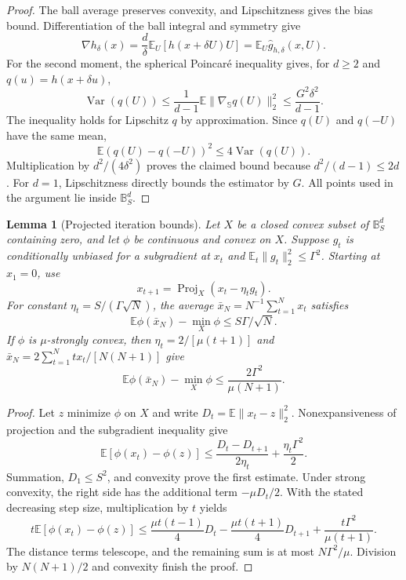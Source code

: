 \documentclass[11pt]{article}
\newcommand{\E}{\mathbb{E}}
\newcommand{\B}{\mathbb{B}}
\newcommand{\Sph}{\mathbb{S}}
\newcommand{\norm}[1]{\lVert #1\rVert_2}
\theoremstyle{plain}
\newtheorem{lemma}[lemma]{Lemma}
\theoremstyle{definition}
\begin{document}
\begin{proof}
The ball average preserves convexity, and Lipschitzness gives the
bias bound. Differentiation of the ball integral and symmetry give
\[
 \nabla h_\delta(x)=\frac d\delta\E_U[h(x+\delta U)U]
                  =\E_U\widehat g_{h,\delta}(x,U).
\]
For the second moment, the spherical Poincar\'e inequality gives, for $d\ge2$ and
$q(u)=h(x+\delta u)$,
\[
 \operatorname{Var}(q(U))
 \le\frac{1}{d-1}\E\|\nabla_{\Sph}q(U)\|_2^2
 \le\frac{G^2\delta^2}{d-1}.
\]
The inequality holds for Lipschitz $q$ by approximation. Since
$q(U)$ and $q(-U)$ have the same mean,
\[
 \E(q(U)-q(-U))^2\le4\operatorname{Var}(q(U)).
\]
Multiplication by $d^2/(4\delta^2)$ proves the claimed bound because
$d^2/(d-1)\le2d$. For $d=1$, Lipschitzness directly bounds the
estimator by $G$. All points used in the argument lie inside $\B_S^d$.
\end{proof}

\begin{lemma}[Projected iteration bounds]\label{lem:projected}
Let $X$ be a closed convex subset of $\B_S^d$ containing zero,
and let $\phi$ be continuous and convex on $X$. Suppose $g_t$ is conditionally
unbiased for a subgradient at $x_t$ and
$\E_t\norm{g_t}^2\le\Gamma^2$. Starting at $x_1=0$, use
\[
 x_{t+1}=\operatorname{Proj}_X(x_t-\eta_tg_t).
\]
For constant $\eta_t=S/(\Gamma\sqrt N)$, the average
$\bar x_N=N^{-1}\sum_{t=1}^Nx_t$ satisfies
\[
 \E\phi(\bar x_N)-\min_X\phi\le S\Gamma/\sqrt N.
\]
If $\phi$ is $\mu$-strongly convex, then
$\eta_t=2/[\mu(t+1)]$ and
$\bar x_N=2\sum_{t=1}^Ntx_t/[N(N+1)]$ give
\[
 \E\phi(\bar x_N)-\min_X\phi\le\frac{2\Gamma^2}{\mu(N+1)}.
\]
\end{lemma}

\begin{proof}
Let $z$ minimize $\phi$ on $X$ and write
$D_t=\E\norm{x_t-z}^2$. Nonexpansiveness of projection and the
subgradient inequality give
\[
 \E[\phi(x_t)-\phi(z)]
 \le\frac{D_t-D_{t+1}}{2\eta_t}+\frac{\eta_t\Gamma^2}{2}.
\]
Summation, $D_1\le S^2$, and convexity prove the first estimate.
Under strong convexity, the right side has the additional term
$-\mu D_t/2$. With the stated decreasing step size, multiplication
by $t$ yields
\[
 t\E[\phi(x_t)-\phi(z)]
 \le\frac{\mu t(t-1)}4D_t
     -\frac{\mu t(t+1)}4D_{t+1}
     +\frac{t\Gamma^2}{\mu(t+1)}.
\]
The distance terms telescope, and the remaining sum is at most
$N\Gamma^2/\mu$. Division by $N(N+1)/2$ and convexity finish the proof.
\end{proof}
\end{document}
